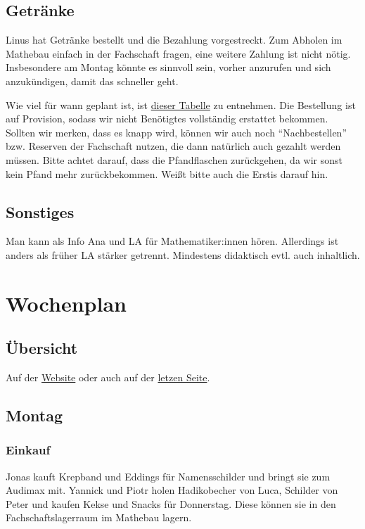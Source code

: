 \documentclass[10pt,ngerman]{scrartcl}
\begin{document}
\begin{multicols}{2}
\subsection{Getränke}\label{drinks}

Linus hat Getränke bestellt und die Bezahlung vorgestreckt.
Zum Abholen im Mathebau einfach in der Fachschaft fragen, eine weitere Zahlung ist nicht nötig.
Insbesondere am Montag könnte es sinnvoll sein, vorher anzurufen und sich anzukündigen, damit das schneller geht.

Wie viel für wann geplant ist, ist \href{https://docs.google.com/spreadsheets/d/1p1hiGPHs2fquxRcn8Yz74vaicJAu-LVF3NOmNHuNc6g/edit?usp=sharing}{dieser Tabelle} zu entnehmen.
Die Bestellung ist auf Provision, sodass wir nicht Benötigtes vollständig erstattet bekommen.
Sollten wir merken, dass es knapp wird, können wir auch noch ``Nachbestellen'' bzw. Reserven der Fachschaft nutzen, die dann natürlich auch gezahlt werden müssen.
Bitte achtet darauf, dass die Pfandflaschen zurückgehen, da wir sonst kein Pfand mehr zurückbekommen.
Weißt bitte auch die Erstis darauf hin.

\subsection{Sonstiges}

Man kann als Info Ana und LA für Mathematiker:innen hören. Allerdings ist
anders als früher LA stärker getrennt. Mindestens didaktisch evtl. auch
inhaltlich.

\section{Wochenplan}

\subsection{Übersicht}

Auf der \href{https://studierlangsam.de/wochenplan}{Website} oder auch auf der \hyperref[LastPage]{letzen Seite}.


\subsection{Montag}


\subsubsection{Einkauf}
Jonas kauft Krepband und Eddings für Namensschilder und bringt sie zum Audimax
mit.
Yannick und Piotr holen Hadikobecher von Luca, Schilder von Peter und kaufen Kekse und Snacks für Donnerstag. Diese können sie in den Fachschaftslagerraum im Mathebau lagern.


\end{multicols}
\end{document}
